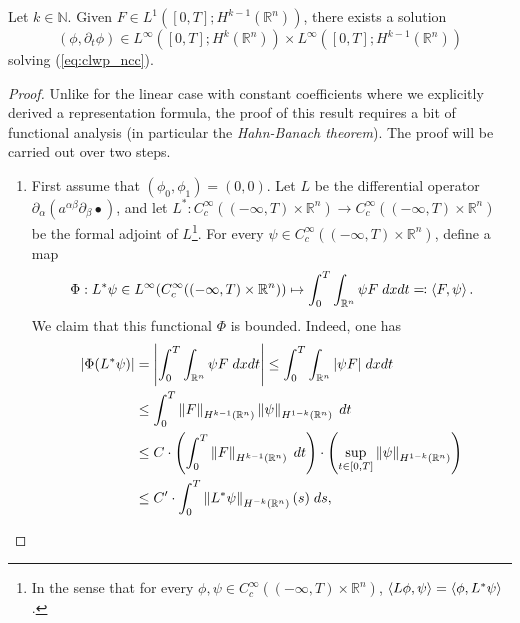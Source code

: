 \documentclass{article}
\begin{document}
\begin{theorem}
	Let $k \in \mathbb{N}$. Given $F \in L^{1}([0,T]; H^{k - 1}(\mathbb{R}^{n}))$, there exists a solution 
	\begin{equation*}
		(\phi, \partial_{t}\phi) \in L^{\infty}([0,T]; H^{k}(\mathbb{R}^{n})) \times L^{\infty}([0,T]; H^{k - 1}(\mathbb{R}^{n}))
	\end{equation*}
	solving (\ref{eq:clwp_ncc}). 
\end{theorem} 
\begin{proof}
	Unlike for the linear case with constant coefficients where we explicitly derived a representation formula, the proof of this result requires a bit of functional analysis (in particular the \textit{Hahn-Banach theorem}). The proof will be carried out over two steps. \vspace{-0.25cm}
	\begin{enumerate}
		\item First assume that $(\phi_{0}, \phi_{1}) = (0,0)$. Let $L$ be the differential operator $\partial_{\alpha}(a^{\alpha \beta}\partial_{\beta} \bullet)$, and let $L^{\ast}: C_{c}^{\infty}((-\infty, T) \times \mathbb{R}^{n}) \to C_{c}^{\infty}((-\infty, T) \times \mathbb{R}^{n})$ be the formal adjoint of $L$\footnote{In the sense that for every $\phi, \psi \in C_{c}^{\infty}((-\infty, T) \times \mathbb{R}^{n})$, $\braket{L\phi, \psi} = \braket{\phi, L^{\ast}\psi}$.}. For every $\psi \in C_{c}^{\infty}((-\infty, T) \times \mathbb{R}^{n})$, define a map 
		\begin{equation*}
			\Phi: L^{\ast}\psi \in L^{\infty}(C_{c}^{\infty}((-\infty, T) \times \mathbb{R}^{n})) \mapsto \int_{0}^{T}\int_{\mathbb{R}^{n}}\psi F\;dxdt \eqqcolon \braket{F, \psi}. 
		\end{equation*} 
		We claim that this functional $\Phi$ is bounded. Indeed, one has 
		\begin{align*}
			\begin{split}
				|\Phi(L^{\ast}\psi)| &= \abs{\int_{0}^{T}\int_{\mathbb{R}^{n}} \psi F\;dxdt} \leq \int_{0}^{T}\int_{\mathbb{R}^{n}}|\psi F|\;dxdt  \\
				&\leq \int_{0}^{T}\norm{F}_{H^{k - 1}(\mathbb{R}^{n})}\norm{\psi}_{H^{1 - k}(\mathbb{R}^{n})} \;dt \\
				&\leq C\cdot \left(\int_{0}^{T}\norm{F}_{H^{k - 1}(\mathbb{R}^{n})}\;dt\right) \cdot \left(\sup_{t \in [0,T]}\norm{\psi}_{H^{1 - k}(\mathbb{R}^{n})}\right) \\
				&\leq C' \cdot \int_{0}^{T}\norm{L^{\ast}\psi}_{H^{-k}(\mathbb{R}^{n})}(s)\;ds, 

\end{split}
\end{align*}
\end{enumerate}
\end{proof}
\end{document}

